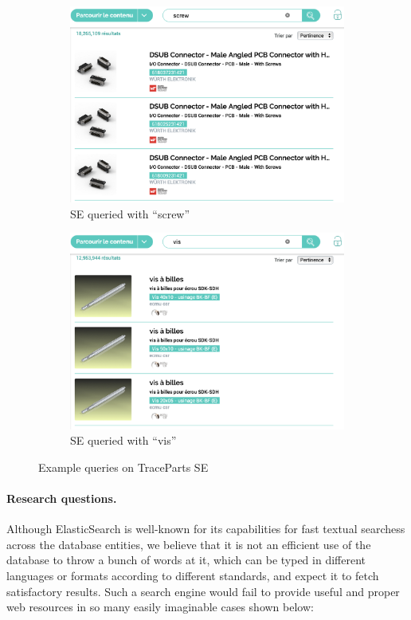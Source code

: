 \begin{figure}[H]
	\centering
	\begin{subfigure}{.5\textwidth}
		\centering
		\includegraphics[width=.96\linewidth]{../../resources/se_test_screw.png}
		\caption{SE queried with ``screw''}
		\label{fig:test_es_screw}
	\end{subfigure}%
	\begin{subfigure}{.5\textwidth}
		\centering
		\includegraphics[width=.96\linewidth]{../../resources/se_test_vis.png}
		\caption{SE queried with ``vis''}
		\label{fig:test_es_vis}
	\end{subfigure}
	\caption{Example queries on TraceParts SE}
	\label{fig:tp_se_test}
\end{figure}

\paragraph{Research questions.}
Although ElasticSearch is well-known for its capabilities for fast textual searchess across the 
database entities, we believe that it is not an efficient use of the database to throw a bunch of 
words at it, which can be typed in different languages or formats according to different standards, 
and expect it to fetch satisfactory results. Such a search engine would fail to provide useful and 
proper web resources in so many easily imaginable cases shown below:

